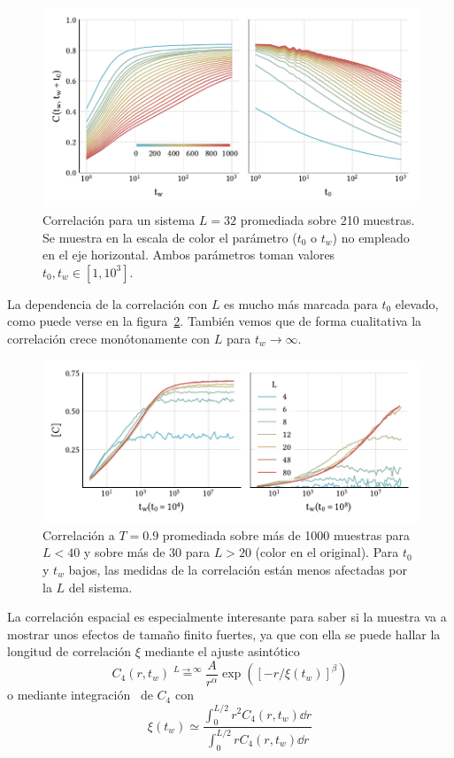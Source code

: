 \documentclass[11pt]{report}
\begin{document}
\begin{figure}
  \centering
  \includegraphics{../study_cases/corr_functional_dependence/corrfunction.pdf}
  \caption{Correlación para un sistema $L=32$ promediada sobre 210
    muestras. Se muestra en la escala de color el parámetro ($t_0$ o
    $t_w$) no empleado en el eje horizontal. Ambos parámetros toman
    valores $t_0,t_w∈[1, 10^3]$.}
  \label{fig:corrfunction}
\end{figure}

La dependencia de la correlación con $L$ es mucho más marcada para
$t_0$ elevado, como puede verse en la figura~\ref{fig:corrfunction_L}.
También vemos que de forma cualitativa la correlación crece
monótonamente con $L$ para $t_w→∞$.

\begin{figure}
  \centering
  \includegraphics{../study_cases/correlation_L_dependence/corrwithL.pdf}
  \caption{Correlación a $T=0.9$ promediada sobre más de 1000 muestras
    para $L<40$ y sobre más de 30 para $L>20$ (color en el original).
    Para $t_0$ y $t_w$ bajos, las medidas de la correlación están menos
    afectadas por la $L$ del sistema.}
  \label{fig:corrfunction_L}
\end{figure}


La correlación espacial es especialmente interesante para
saber si la muestra va a mostrar unos efectos de tamaño finito
fuertes, ya que con ella se puede hallar la longitud de correlación
$ξ$ mediante el ajuste asintótico~\cite{c4fit}
\begin{equation}
  C_4 (r,t_w) \stackrel{L→∞}{=} \frac{A}{r^α} \exp \left( [-r/ξ(t_w)]^β \right)
  \label{eq:fitotron}
\end{equation}
o mediante integración~\cite{c4integration} de $C_4$ con
\begin{equation}
  ξ(t_w) ≃ \frac{\int_0^{L/2} r^2 C_4(r, t_w) \dd{r}}{\int_0^{L/2} r C_4(r, t_w) \dd{r}}
  \label{eq:integranator}
\end{equation}
\end{document}
